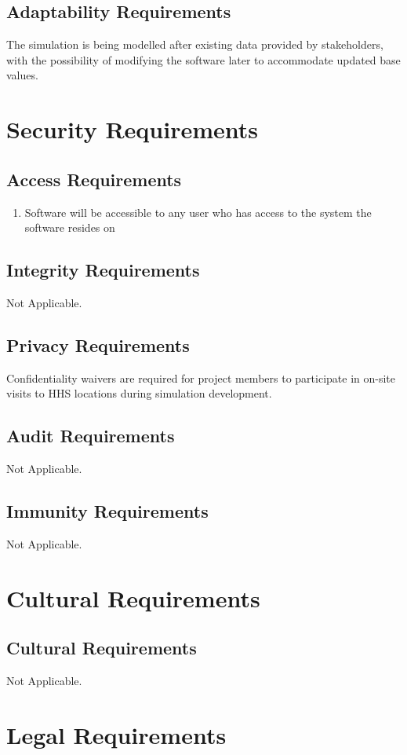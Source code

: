 \documentclass[paper=letter, fontsize=10pt]{scrartcl}
\numberwithin{equation}{section}		%
\numberwithin{figure}{section}			%
\numberwithin{table}{section}				%
\begin{document}
\subsection{Adaptability Requirements}
The simulation is being modelled after existing data provided by stakeholders, with the possibility of modifying the software later to accommodate updated base values. 

\section{Security Requirements}
\subsection{Access Requirements}
	\begin{enumerate}
		\item Software will be accessible to any user who has access to the system the software resides on
	\end{enumerate}
\subsection{Integrity Requirements}
Not Applicable.
\subsection{Privacy Requirements}
Confidentiality waivers are required for project members to participate in on-site visits to HHS locations during simulation development.
\subsection{Audit Requirements}
Not Applicable.
\subsection{Immunity Requirements}
Not Applicable.

\section{Cultural Requirements}
\subsection{Cultural Requirements}
Not Applicable.

\section{Legal Requirements}
\end{document}
